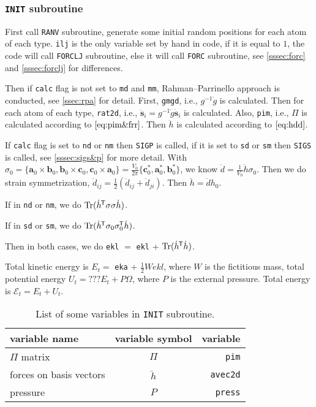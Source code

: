 
\subsubsection{\texttt{INIT} subroutine}

First call \texttt{RANV} subroutine,
generate some initial random positions for each atom of each type.
\texttt{ilj} is the only variable set by hand in code, if it is equal to $1$,
the code will call \texttt{FORCLJ} subroutine, else it will call \texttt{FORC}
subroutine, see \ref{sssec:forc} and \ref{sssec:forclj} for differences.

Then if \texttt{calc} flag is not set to \texttt{md} and \texttt{mm},
Rahman--Parrinello approach is conducted, see \ref{ssec:rpa} for detail.
First, \texttt{gmgd}, i.e., $g^{-1} \dot{g}$ is calculated.
Then for each atom of each type,
\texttt{rat2d}, i.e., $\ddot{\bm{s}}_i = g^{-1} \dot{g} \dot{ \bm{s} }_i$ is calculated.
Also, \texttt{pim}, i.e., $\Pi$ is calculated according to $\eqref{eq:pim&frr}$.
Then $\ddot{h}$ is calculated according to $\eqref{eq:hdd}$.

If \texttt{calc} flag is set to \texttt{nd} or \texttt{nm}
then \texttt{SIGP} is called, if it is set to \texttt{sd} or
\texttt{sm} then \texttt{SIGS} is called, see \ref{sssec:sigs&p}
for more detail.
With
$\sigma_0 =
\{
\bm{a}_0 \times \bm{b}_0, \bm{b}_0 \times \bm{c}_0,
\bm{c}_0 \times \bm{a}_0
\}
= \frac{ V_0 }{ 2\pi } \{
\bm{c}^\ast_0, \bm{a}^\ast_0, \bm{b}^\ast_0
\}$,
we know
$\ddot{d} = \frac{ 1 }{ V_0 }\ddot{h} \sigma_0$.
Then we do strain symmetrization, $\ddot{d}_{ij} = \frac{ 1 }{ 2 }
(\ddot{d}_{ij} + \ddot{d}_{ji})$.
Then $\ddot{h} = \ddot{d} h_0$.

If in \texttt{nd} or \texttt{nm}, we do
$\operatorname{Tr} (\dot{h}^{\mkern-1.5mu\mathsf{T}} \sigma \sigma \dot{h})$.

If in \texttt{sd} or \texttt{sm}, we do
$\operatorname{Tr}(\dot{h}^{\mkern-1.5mu\mathsf{T}} \sigma_0 \sigma_0^{\mkern-1.5mu\mathsf{T}} \dot{ h })$.

Then in both cases, we do
\texttt{ekl} $=$ \texttt{ekl} + $\operatorname{Tr} (\dot{ h }^{\mkern-1.5mu\mathsf{T}} \dot{ h })$.

Total kinetic energy is $E_{t} = $ \texttt{eka} + $\frac{ 1 }{ 2 } W ekl$,
where $W$ is the fictitious mass,
total potential energy $U_{t} = ???E_{t} + P \Omega$, where $P$ is the external pressure.
Total energy is $\mathscr{E}_{t} = E_t + U_{t}$.

\begin{table}[h]
 \centering
 \caption{List of some variables in \texttt{INIT} subroutine.}
 \begin{tabular}{@{}lcr@{}}
  \toprule
  {variable name}         & variable symbol & variable        \\
  \midrule
  $\Pi$ matrix            & $\Pi$           & \texttt{pim}    \\
  forces on basis vectors & $\ddot{h}$      & \texttt{avec2d} \\
  pressure                & $P$             & \texttt{press}  \\
  \bottomrule
 \end{tabular}%
 \label{tab:init}%
\end{table}%
